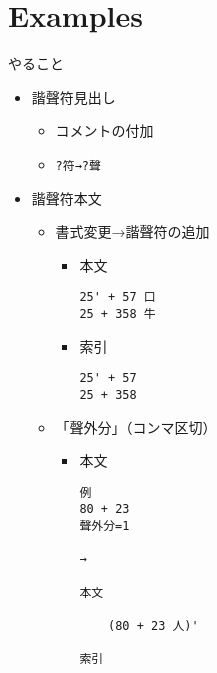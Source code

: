\documentclass[a5paper]{article}
\begin{document}
\part{Examples}
やること
\begin{itemize}
\item{} 諧聲符見出し
  \begin{itemize}
  \item{} コメントの付加
  \item{} \verb|?符→?聲|
  \end{itemize}
\item{} 諧聲符本文
  \begin{itemize}
  \item{} 書式変更→諧聲符の追加
    \begin{itemize}
    \item{} 本文
\begin{verbatim}
25' + 57 口
25 + 358 牛
\end{verbatim}
    \item{} 索引
\begin{verbatim}
25' + 57
25 + 358 
\end{verbatim}
    \end{itemize}
  \item{} 「聲外分」（コンマ区切）
    \begin{itemize}
    \item{} 本文
\begin{verbatim}
例
80 + 23
聲外分=1

→

本文

    (80 + 23 人)'

索引


\end{verbatim}
\end{itemize}
\end{itemize}
\end{itemize}
\end{document}
